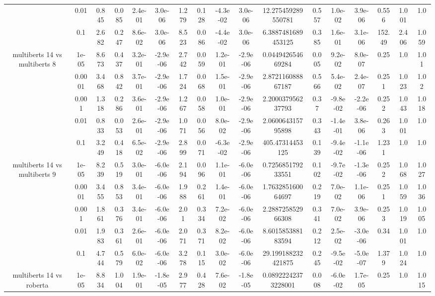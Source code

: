\begin{tabular}{|c|c|c|c|c|c|c|c|c|c|c|c|c|c|c|c|c|}
 & 0.01 & 0.845 & 0.085 & 2.4e-01 & 3.0e-06 & 1.279 & 0.128 & -4.3e-02 & 3.0e-06 & 12.275459289550781 & 0.557 & 1.0e-02 & 3.9e-06 & 0.556 & 1.001 & 1.0 \\
 & 0.1 & 2.682 & 0.247 & 8.6e-02 & 3.0e-06 & 8.523 & 0.086 & -4.4e-02 & 3.0e-06 & 6.3887481689453125 & 0.385 & 1.6e-01 & 3.1e-06 & 152.49 & 2.406 & 1.059 \\
\hline
\multirow{5}{*}{multiberts 14 vs multiberts 8} & 1e-05 & 8.673 & 0.437 & 3.2e-01 & -2.9e-06 & 2.742 & 0.059 & 1.2e-01 & -2.9e-06 & 0.044942654669284 & 0.005 & 9.2e-02 & 8.0e-07 & 0.25 & 1.0 & 1.01 \\
 & 0.0001 & 3.468 & 0.842 & 3.7e-01 & -2.9e-06 & 1.724 & 0.068 & 1.5e-01 & -2.9e-06 & 2.872116088867187 & 0.566 & 5.4e-02 & 2.4e-07 & 0.251 & 1.023 & 1.02 \\
 & 0.001 & 1.318 & 0.286 & 3.6e-01 & -2.9e-06 & 1.267 & 0.058 & 1.0e-01 & -2.9e-06 & 2.200037956237793 & 0.37 & -9.8e-02 & -2.2e-06 & 0.252 & 1.043 & 1.018 \\
 & 0.01 & 0.833 & 0.053 & 2.6e-01 & -2.9e-06 & 1.071 & 0.056 & 8.0e-02 & -2.9e-06 & 2.060064315795898 & 0.343 & -1.4e-01 & 3.8e-06 & 0.263 & 1.001 & 1.0 \\
 & 0.1 & 3.249 & 0.418 & 6.5e-02 & -2.9e-06 & 2.899 & 0.071 & -6.3e-02 & -2.9e-06 & 405.47314453125 & 0.139 & -9.4e-02 & -1.1e-06 & 1.231 & 1.0 & 1.0 \\
\hline
\multirow{5}{*}{multiberts 14 vs multiberts 9} & 1e-05 & 8.239 & 0.519 & 3.0e-01 & -6.0e-06 & 2.194 & 0.096 & 1.1e-01 & -6.0e-06 & 0.725685179233551 & 0.102 & -9.7e-02 & -1.3e-06 & 0.252 & 1.068 & 1.027 \\
 & 0.0001 & 3.455 & 0.853 & 3.4e-01 & -6.0e-06 & 1.988 & 0.261 & 1.4e-01 & -6.0e-06 & 1.763285160064697 & 0.219 & 7.0e-02 & 1.1e-06 & 0.251 & 1.059 & 1.036 \\
 & 0.001 & 1.861 & 0.376 & 3.4e-01 & -6.0e-06 & 2.01 & 0.334 & 7.2e-02 & -6.0e-06 & 2.288725852966308 & 0.341 & 7.0e-02 & 3.9e-06 & 0.253 & 1.019 & 1.005 \\
 & 0.01 & 1.983 & 0.361 & 2.6e-01 & -6.0e-06 & 2.071 & 0.371 & 8.2e-02 & -6.0e-06 & 8.601585388183594 & 0.212 & 2.5e-02 & -3.0e-06 & 0.34 & 1.001 & 1.0 \\
 & 0.1 & 4.744 & 0.579 & 6.0e-02 & -6.0e-06 & 3.278 & 0.115 & 3.0e-02 & -6.0e-06 & 29.199188232421875 & 0.245 & -9.5e-02 & -5.0e-07 & 1.379 & 1.024 & 1.0 \\
\hline
\multirow{5}{*}{multiberts 14 vs roberta } & 1e-05 & 8.834 & 1.004 & 1.9e-01 & -1.8e-05 & 2.977 & 0.428 & 7.6e-02 & -1.8e-05 & 0.08922242373228001 & 0.008 & -6.0e-02 & 1.7e-05 & 0.25 & 1.0 & 1.015 \\

\end{tabular}
